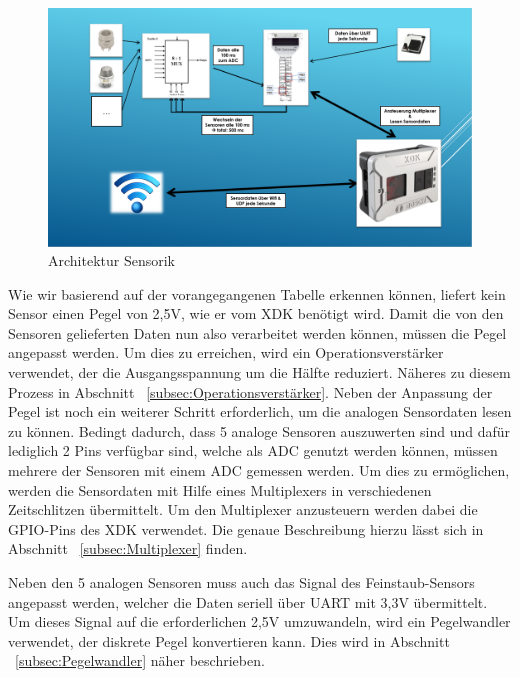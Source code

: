 \begin{figure}[H]	
	\includegraphics[width=\textwidth]{images/Architektur_fein.png}	
	\caption{Architektur Sensorik}
	\label{fig:Architektur_fein}
\end{figure}

Wie wir basierend auf der vorangegangenen Tabelle erkennen können, liefert kein Sensor einen Pegel von 2,5V, wie er vom \acs{XDK} benötigt wird. Damit die von den Sensoren gelieferten Daten nun also verarbeitet werden können, müssen die Pegel angepasst werden. Um dies zu erreichen, wird ein Operationsverstärker verwendet, der die Ausgangsspannung um die Hälfte reduziert. Näheres zu diesem Prozess in Abschnitt ~\ref{subsec:Operationsverstärker}.
Neben der Anpassung der Pegel ist noch ein weiterer Schritt erforderlich, um die analogen Sensordaten lesen zu können. Bedingt dadurch, dass 5 analoge Sensoren auszuwerten sind und dafür lediglich 2 Pins verfügbar sind, welche als \acs{ADC} genutzt werden können, müssen mehrere der Sensoren mit einem \acs{ADC} gemessen werden. Um dies zu ermöglichen, werden die Sensordaten mit Hilfe eines Multiplexers in verschiedenen Zeitschlitzen übermittelt. Um den Multiplexer anzusteuern werden dabei die \acs{GPIO}-Pins des \acs{XDK} verwendet. Die genaue Beschreibung hierzu lässt sich in Abschnitt ~\ref{subsec:Multiplexer} finden.

Neben den 5 analogen Sensoren muss auch das Signal des Feinstaub-Sensors angepasst werden, welcher die Daten seriell über \acs{UART} mit 3,3V übermittelt. Um dieses Signal auf die erforderlichen 2,5V umzuwandeln, wird ein Pegelwandler verwendet, der diskrete Pegel konvertieren kann. Dies wird in Abschnitt ~\ref{subsec:Pegelwandler} näher beschrieben.

